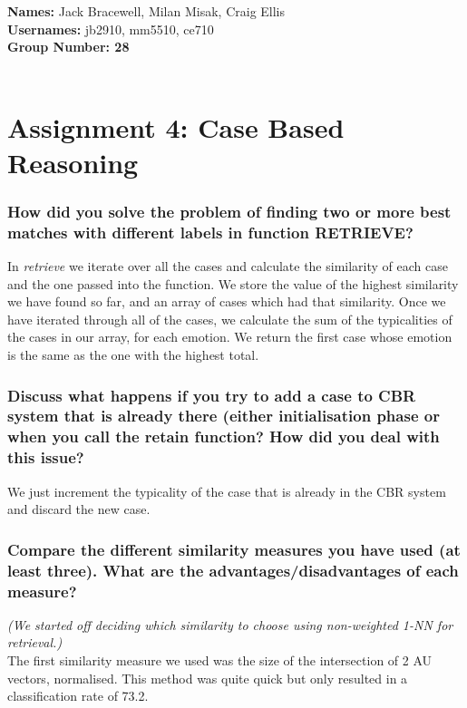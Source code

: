 \documentclass[12pt]{article}
\begin{document}
{\bf Names:} Jack Bracewell, Milan Misak, Craig Ellis \\
{\bf Usernames:} jb2910, mm5510, ce710 \\
{\bf Group Number: 28}  \\ \\

\section*{Assignment 4: Case Based Reasoning}

\subsubsection*{How did you solve the problem of finding two or more best matches with different labels in function RETRIEVE?}

In \emph{retrieve} we iterate over all the cases and calculate the similarity of each case and the one passed into the function. We store the value of the highest similarity we have found so far, and an array of cases which had that similarity. Once we have iterated through all of the cases, we calculate the sum of the typicalities of the cases in our array, for each emotion. We return the first case whose emotion is the same as the one with the highest total. \\

\subsubsection*{Discuss what happens if you try to add a case to CBR system that is already there (either initialisation phase or when you call the retain function? How did you deal with this issue?}

We just increment the typicality of the case that is already in the CBR system and discard the new case. 

\subsubsection*{Compare the different similarity measures you have used (at least three). What are the advantages/disadvantages of each measure?}

\emph{(We started off deciding which similarity to choose using non-weighted 1-NN for retrieval.)} \\

The first similarity measure we used was the size of the intersection of 2 AU vectors, normalised. This method was quite quick but only resulted in a classification rate of 73.2. \\ 
\end{document}
